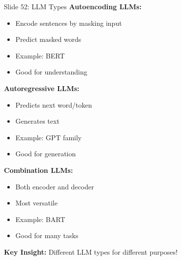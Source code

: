 \documentclass[8pt]{beamer}
\begin{document}
	\begin{frame}{Slide 52: LLM Types}
		\fontsize{6.5}{7.5}\selectfont
		\textbf{Autoencoding LLMs:}
		\begin{itemize}
			\item Encode sentences by masking input
			\item Predict masked words
			\item Example: BERT
			\item Good for understanding
		\end{itemize}
		
		\vspace{0.1cm}
		\textbf{Autoregressive LLMs:}
		\begin{itemize}
			\item Predicts next word/token
			\item Generates text
			\item Example: GPT family
			\item Good for generation
		\end{itemize}
		
		\vspace{0.1cm}
		\textbf{Combination LLMs:}
		\begin{itemize}
			\item Both encoder and decoder
			\item Most versatile
			\item Example: BART
			\item Good for many tasks
		\end{itemize}
		
		\textcolor{myblue}{\textbf{Key Insight:}} Different LLM types for different purposes!
	\end{frame}
	
\end{document}
